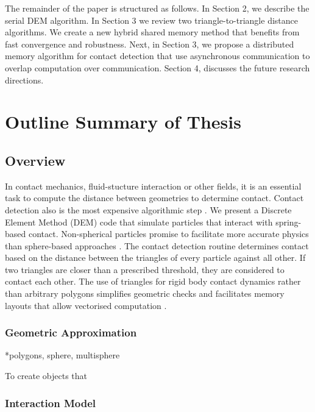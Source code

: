 \documentclass[times,12pt]{article}
\begin{document}
The remainder of the paper is structured as follows. In Section 2, we describe the serial DEM  algorithm. In Section 3 we review two triangle-to-triangle distance algorithms. We create a new hybrid shared memory method that benefits from fast convergence and robustness. Next, in Section 3, we propose a distributed memory algorithm for contact detection that use asynchronous communication to overlap computation over communication. Section 4, discusses the future research directions.

\section{Outline Summary of Thesis}

\subsection{Overview}

In contact mechanics, fluid-stucture interaction or other fields, it is an essential task to compute the distance between geometries to determine contact. Contact detection also is the most expensive algorithmic step \cite{Koziara2010, Wachs2012}. We present a Discrete Element Method (DEM) code that simulate particles that interact with spring-based contact. Non-spherical particles promise to facilitate more accurate physics than sphere-based approaches \cite{AlonsoMarroqu2013, Girolami2012}. The contact detection routine determines contact based on the distance between the triangles of every particle against all other. If two triangles are closer than a prescribed threshold, they are considered to contact each other. The use of triangles for rigid body contact dynamics rather than arbitrary polygons simplifies geometric checks and facilitates memory layouts that allow vectorised computation \cite{Eichenberger2004, Juurlink, Krestenitis2015, Krestenitis2016}.

\subsubsection{Geometric Approximation}

*polygons, sphere, multisphere

To create objects that 

\subsubsection{Interaction Model}
\end{document}
